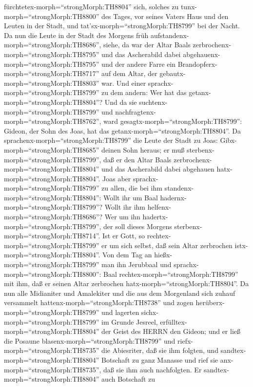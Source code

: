 fürchtetex-morph=``strongMorph:TH8804'' sich, solches zu
tunx-morph=``strongMorph:TH8800'' des Tages, vor seines Vaters Haus und
den Leuten in der Stadt, und tat'sx-morph=``strongMorph:TH8799'' bei der
Nacht.  Da nun die Leute in der Stadt des Morgens früh
aufstandenx-morph=``strongMorph:TH8686'', siehe, da war der Altar Baals
zerbrochenx-morph=``strongMorph:TH8795'' und das Ascherabild dabei
abgehauenx-morph=``strongMorph:TH8795'' und der andere Farre ein
Brandopferx-morph=``strongMorph:TH8717'' auf dem Altar, der
gebautx-morph=``strongMorph:TH8803'' war.  Und einer
sprachx-morph=``strongMorph:TH8799'' zu dem andern: Wer hat das
getanx-morph=``strongMorph:TH8804''? Und da sie
suchtenx-morph=``strongMorph:TH8799'' und
nachfragtenx-morph=``strongMorph:TH8762'', ward
gesagtx-morph=``strongMorph:TH8799'': Gideon, der Sohn des Joas, hat das
getanx-morph=``strongMorph:TH8804''.  Da
sprachenx-morph=``strongMorph:TH8799'' die Leute der Stadt zu Joas:
Gibx-morph=``strongMorph:TH8685'' deinen Sohn heraus; er muß
sterbenx-morph=``strongMorph:TH8799'', daß er den Altar Baals
zerbrochenx-morph=``strongMorph:TH8804'' und das Ascherabild dabei
abgehauen hatx-morph=``strongMorph:TH8804''.  Joas aber
sprachx-morph=``strongMorph:TH8799'' zu allen, die bei ihm
standenx-morph=``strongMorph:TH8804'': Wollt ihr um Baal
hadernx-morph=``strongMorph:TH8799''? Wollt ihr ihm
helfenx-morph=``strongMorph:TH8686''? Wer um ihn
hadertx-morph=``strongMorph:TH8799'', der soll dieses Morgens
sterbenx-morph=``strongMorph:TH8714''. Ist er Gott, so
rechtex-morph=``strongMorph:TH8799'' er um sich selbst, daß sein Altar
zerbrochen istx-morph=``strongMorph:TH8804''.  Von dem Tag
an hießx-morph=``strongMorph:TH8799'' man ihn Jerubbaal und
sprachx-morph=``strongMorph:TH8800'': Baal
rechtex-morph=``strongMorph:TH8799'' mit ihm, daß er seinen Altar
zerbrochen hatx-morph=``strongMorph:TH8804''.  Da nun alle
Midianiter und Amalekiter und die aus dem Morgenland sich zuhauf
versammelt hattenx-morph=``strongMorph:TH8738'' und zogen
herüberx-morph=``strongMorph:TH8799'' und lagerten
sichx-morph=``strongMorph:TH8799'' im Grunde Jesreel, 
erfülltex-morph=``strongMorph:TH8804'' der Geist des HERRN den Gideon;
und er ließ die Posaune blasenx-morph=``strongMorph:TH8799'' und
riefx-morph=``strongMorph:TH8735'' die Abiesriter, daß sie ihm folgten,
 und sandtex-morph=``strongMorph:TH8804'' Botschaft zu ganz
Manasse und rief sie anx-morph=``strongMorph:TH8735'', daß sie ihm auch
nachfolgten. Er sandtex-morph=``strongMorph:TH8804'' auch Botschaft zu
